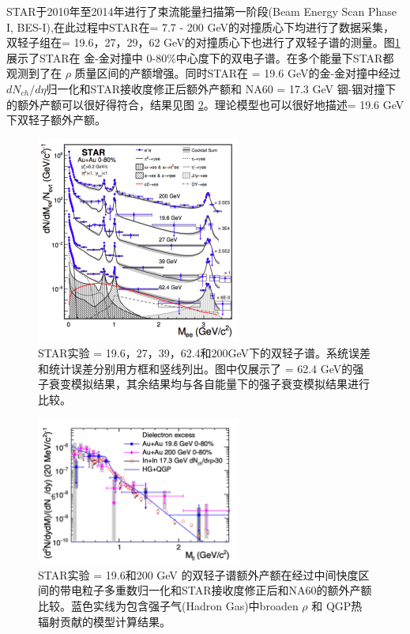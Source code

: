 STAR于2010年至2014年进行了束流能量扫描第一阶段(Beam Energy Scan Phase I, BES-I),在此过程中STAR在\sNN = 7.7 - 200 GeV的对撞质心下均进行了数据采集，双轻子组在\sNN = 19.6，27，29，62 GeV的对撞质心下也进行了双轻子谱的测量。图\ref{fig:STARBES}展示了STAR在 \egyfive 金-金对撞中 0-80\%中心度下的双电子谱。在多个能量下STAR都观测到了在 $\rho$ 质量区间的产额增强。同时STAR在 \sNN = 19.6 GeV的金-金对撞中经过$dN_{ch}/d\eta$归一化和STAR接收度修正后额外产额和 NA60 \sNN = 17.3 GeV 铟-铟对撞下的额外产额可以很好得符合，结果见图 \ref{fig:STAR19p6}。理论模型也可以很好地描述\sNN = 19.6 GeV下双轻子额外产额。

\begin{figure}[htb]
    \begin{center}
    \includegraphics[width=0.6\textwidth,clip]{figures/Chapter1/STARBES.png}
    \end{center}
    \caption[STAR实验 \egyfive 下的双轻子谱]{STAR实验 \sNN = 19.6，27，39，62.4和200GeV下的双轻子谱。系统误差和统计误差分别用方框和竖线列出。图中仅展示了 \sNN = 62.4 GeV的强子衰变模拟结果，其余结果均与各自能量下的强子衰变模拟结果进行比较。}
    \label{fig:STARBES}
\end{figure}

\begin{figure}[htb]
    \begin{center}
    \includegraphics[width=0.6\textwidth,clip]{figures/Chapter1/STAR19p6.png}
    \end{center}
    \caption[STAR实验 \sNN = 19.6和200 GeV 的双轻子谱额外产额和NA60的额外产额比较]{STAR实验 \sNN = 19.6和200 GeV 的双轻子谱额外产额在经过中间快度区间的带电粒子多重数归一化和STAR接收度修正后和NA60的额外产额比较。蓝色实线为包含强子气(Hadron Gas)中broaden $\rho$ 和 QGP热辐射贡献的模型计算结果。 }
    \label{fig:STAR19p6}
\end{figure}

